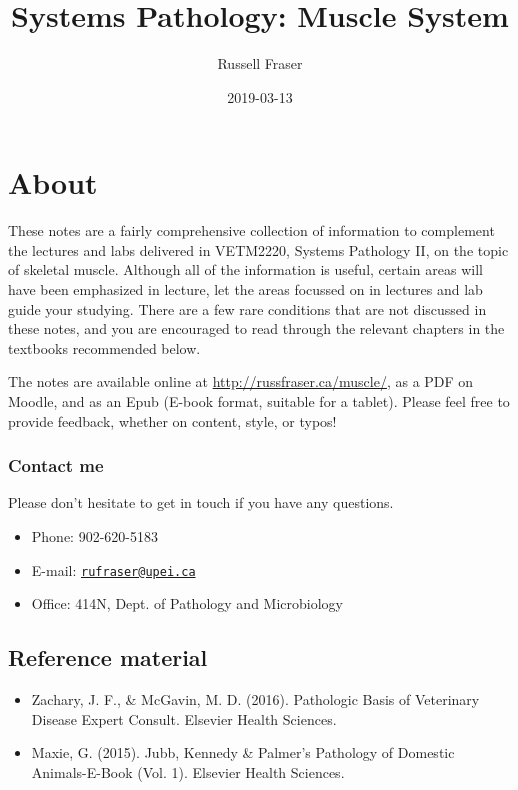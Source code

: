 \documentclass[openany]{book}
\title{Systems Pathology: Muscle System}
\author{Russell Fraser}
\date{2019-03-13}
\providecommand{\tightlist}{%
  \setlength{\itemsep}{0pt}\setlength{\parskip}{0pt}}
\begin{document}
\maketitle

{
\setcounter{tocdepth}{1}
\tableofcontents
}
\chapter*{About}\label{about}

These notes are a fairly comprehensive collection of information to
complement the lectures and labs delivered in VETM2220, Systems
Pathology II, on the topic of skeletal muscle. Although all of the
information is useful, certain areas will have been emphasized in
lecture, let the areas focussed on in lectures and lab guide your
studying. There are a few rare conditions that are not discussed in
these notes, and you are encouraged to read through the relevant
chapters in the textbooks recommended below.

The notes are available online at \url{http://russfraser.ca/muscle/}, as
a PDF on Moodle, and as an Epub (E-book format, suitable for a tablet).
Please feel free to provide feedback, whether on content, style, or
typos!

\subsection*{Contact me}\label{contact-me}

Please don't hesitate to get in touch if you have any questions.

\begin{itemize}
\tightlist
\item
  Phone: 902-620-5183
\item
  E-mail: \href{mailto:rufraser@upei.ca}{\nolinkurl{rufraser@upei.ca}}
\item
  Office: 414N, Dept. of Pathology and Microbiology
\end{itemize}

\section*{Reference material}\label{reference-material}

\begin{itemize}
\tightlist
\item
  Zachary, J. F., \& McGavin, M. D. (2016). Pathologic Basis of
  Veterinary Disease Expert Consult. Elsevier Health Sciences.
\item
  Maxie, G. (2015). Jubb, Kennedy \& Palmer's Pathology of Domestic
  Animals-E-Book (Vol. 1). Elsevier Health Sciences.
\end{itemize}
\end{document}
